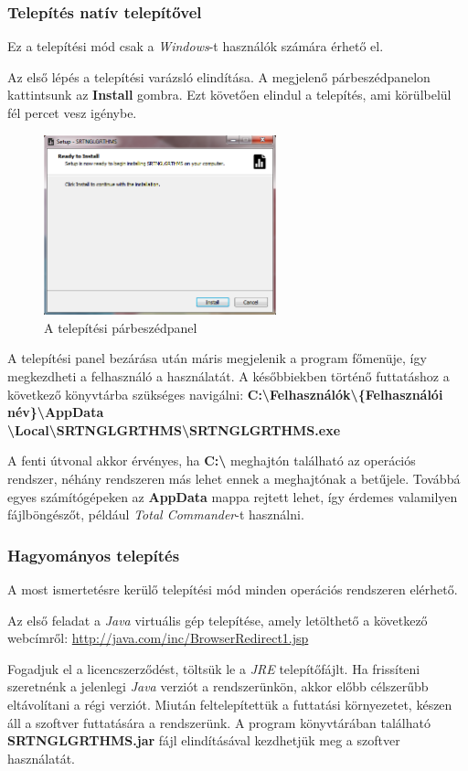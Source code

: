 \documentclass{elteikthesis}
\begin{document}
\subsubsection{Telepítés natív telepítővel}
Ez a telepítési mód csak a \emph{Windows}-t használók számára érhető el.\par
Az első lépés a telepítési varázsló elindítása. A megjelenő párbeszédpanelon kattintsunk az \textbf{Install} gombra. Ezt követően elindul a telepítés, ami körülbelül fél percet vesz igénybe.\par
\begin{figure}[H]
	\centering
	\includegraphics[width=0.6\textwidth]{pics/setup.png}
	\caption{A telepítési párbeszédpanel}
\end{figure}
A telepítési panel bezárása után máris megjelenik a program főmenüje, így megkezdheti a felhasználó a használatát. A későbbiekben történő futtatáshoz a következő könyvtárba szükséges navigálni: \textbf{C:\textbackslash Felhasználók\textbackslash \{Felhasználói név\}\textbackslash AppData\\ \textbackslash Local\textbackslash SRTNGLGRTHMS\textbackslash SRTNGLGRTHMS.exe} \par
A fenti útvonal akkor érvényes, ha \textbf{C:\textbackslash} meghajtón található az operációs rendszer, néhány rendszeren más lehet ennek a meghajtónak a betűjele. Továbbá egyes számítógépeken az \textbf{AppData} mappa rejtett lehet, így érdemes valamilyen fájlböngészőt, például \emph{Total Commander}-t használni.

\subsubsection{Hagyományos telepítés}
A most ismertetésre kerülő telepítési mód minden operációs rendszeren elérhető.\par
Az első feladat a \emph{Java} virtuális gép telepítése, amely letölthető a következő webcímről: \url{http://java.com/inc/BrowserRedirect1.jsp}\par
Fogadjuk el a licencszerződést, töltsük le a \emph{JRE} telepítőfájlt. Ha frissíteni szeretnénk a jelenlegi \emph{Java} verziót a rendszerünkön, akkor előbb célszerűbb eltávolítani a régi verziót. Miután feltelepítettük a futtatási környezetet,  készen áll a szoftver futtatására a rendszerünk. A program könyvtárában található \textbf{SRTNGLGRTHMS.jar} fájl elindításával kezdhetjük meg a szoftver használatát.
\end{document}
